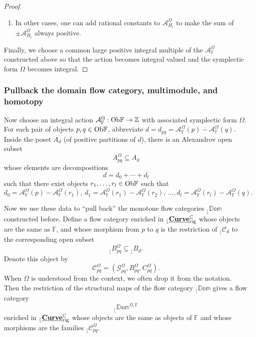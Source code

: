 \documentclass[reqno, 10pt]{amsart}
\numberwithin{equation}{section}
\numberwithin{equation}{section}
\renewcommand{\subset}{\subseteq}
\theoremstyle{definition}
\theoremstyle{remark}
\newcommand{\beqn}{\begin{equation*}}
\newcommand{\eeqn}{\end{equation*}}
\newcommand{\mb}{\mathbb}
\newcommand{\mc}{\mathcal}
\renewcommand{\outer}{{}_{\lfloor}}
\newcommand{\uds}[1]{\underline{\smash{#1}}}
\begin{document}
\begin{proof}
\begin{enumerate}
\item In other cases, one can add rational constants to ${\mc A}_{H_i}^\Omega$ to make the sum of $\pm {\mc A}_{H_i}^\Omega$ always positive.
\end{enumerate}
Finally, we choose a common large positive integral multiple of the ${\mc A}^{\Omega}_{\mb F}$ constructed above so that the action becomes integral valued and the symplectic form $\Omega$ becomes integral.
\end{proof}





\subsubsection{Pullback the domain flow category, multimodule, and homotopy}\label{subsubsec:pullback-curve}

Now choose an integral action  ${\mc A}_{\mb F}^\Omega:  {\rm Ob}{\mb F} \to {\mb Z}$ with associated symplectic form $\Omega$. For each pair of objects $p, q \in {\rm Ob}{\mb F}$, abbreviate $d = d_{pq} = {\mc A}_{\mb F}^\Omega(p) - {\mc A}_{\mb F}^\Omega (q)$. Inside the poset $A_{d}$ (of positive partitions of $d$), there is an Alexandrov open subset 
\beqn
A_{pq}^\Omega \subset A_d
\eeqn
whose elements are decompositions 
\beqn
d = d_0 + \cdots + d_l
\eeqn
such that there exist objects $r_1, \ldots, r_l\in {\rm Ob} {\mb F}$ such that 
\beqn
d_0 = {\mc A}_{\mb F}^\Omega (p) - {\mc A}_{\mb F}^\Omega ({r_1}),\ d_1 = {\mc A}_{\mb F}^\Omega (r_1) - {\mc A}_{\mb F}^\Omega (r_2),\ \ldots, d_l =  {\mc A}_{\mb F}^\Omega (r_l) -{\mc A}_{\mb F}^\Omega (q).
\eeqn

Now we use these data to ``pull back'' the monotone flow categories $\outer \mb{Dom}$ constructed before. Define a flow category enriched in $\outer \uds{\bf Curve}_{\rm rig}^{\mb C}$ whose objects are the same as ${\mb F}$, and whose morphism from $p$ to $q$ is the restriction of $\outer {\mc C}_{d}$ to the corresponding open subset
\beqn
\outer B_{pq}^\Omega \subset \outer B_d.
\eeqn
Denote this object by 
\beqn
{\mc C}_{pq}^\Omega = ({\mc G}_{pq}^\Omega, B_{pq}^\Omega, C_{pq}^\Omega).
\eeqn
When $\Omega$ is understood from the context, we often drop it from the notation. Then the restriction of the structural maps of the flow category $\outer \mb{Dom}$ gives a flow category
\beqn
\outer \mb{Dom}^{\Omega, {\mb F}}
\eeqn
enriched in $\outer \uds{\bf Curve}_{\rm rig}^{\mb C}$ whose objects are the same as objects of ${\mb F}$ and whose morphisms are the families $\outer {\mc C}_{pq}^\Omega$.
\end{document}

